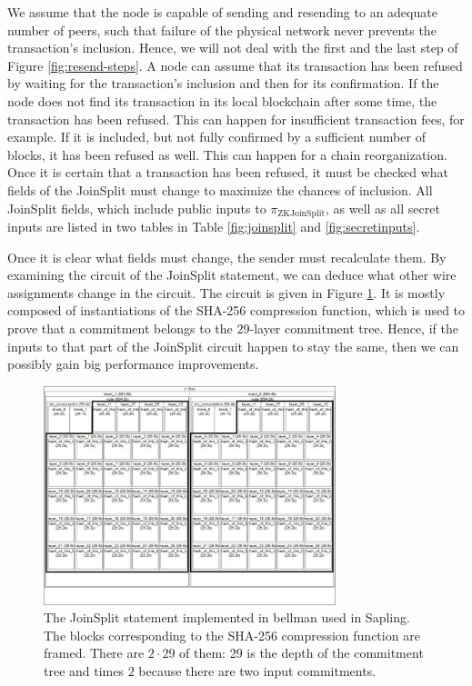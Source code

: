 \documentclass{article}
\begin{document}
We assume that the node is capable of sending and resending to an adequate number of peers, such that failure of the physical network never prevents the transaction's inclusion.
Hence, we will not deal with the first and the last step of Figure \ref{fig:resend-steps}.
A node can assume that its transaction has been refused by waiting for the transaction's inclusion and then for its confirmation.
If the node does not find its transaction in its local blockchain after some time, the transaction has been refused.
This can happen for insufficient transaction fees, for example.
If it is included, but not fully confirmed by a sufficient number of blocks, it has been refused as well.
This can happen for a chain reorganization.
Once it is certain that a transaction has been refused, it must be checked what fields of the JoinSplit must change to maximize the chances of inclusion.
All JoinSplit fields, which include public inputs to $\pi_\text{ZKJoinSplit}$, as well as all secret inputs are listed in two tables in Table \ref{fig:joinsplit} and \ref{fig:secretinputs}.

Once it is clear what fields must change, the sender must recalculate them.
By examining the circuit of the JoinSplit statement, we can deduce what other wire assignments change in the circuit.
The circuit is given in Figure \ref{fig:joinsplit-circuit}.
It is mostly composed of instantiations of the SHA-256 compression function, which is used to prove that a commitment belongs to the 29-layer commitment tree.
Hence, if the inputs to that part of the JoinSplit circuit happen to stay the same, then we can possibly gain big performance improvements.

\begin{figure}[t]
\includegraphics[width=8.5cm]{images/joinsplit-groth16-circuit.jpeg}
\caption{The JoinSplit statement implemented in bellman used in Sapling. The blocks corresponding to the SHA-256 compression function are framed. There are $2\cdot 29$ of them: 29 is the depth of the commitment tree and times $2$ because there are two input commitments.} \label{fig:joinsplit-circuit}
\centering
\end{figure}
\end{document}
